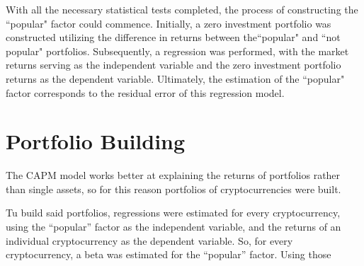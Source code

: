 With all the necessary statistical tests completed, the process of constructing the ``popular" factor could commence. Initially, a zero investment portfolio was constructed utilizing the difference in returns between the``popular" and ``not popular" portfolios. Subsequently, a regression was performed, with the market returns serving as the independent variable and the zero investment portfolio returns as the dependent variable. Ultimately, the estimation of the ``popular" factor corresponds to the residual error of this regression model.

\section{Portfolio Building}
The CAPM model works better at explaining the returns of portfolios rather than single assets, so for this reason portfolios of cryptocurrencies were built.

Tu build said portfolios, regressions were estimated for every cryptocurrency, using the ``popular'' factor as the independent variable, and the returns of an individual cryptocurrency as the dependent variable. So, for every cryptocurrency, a beta was estimated for the ``popular'' factor. Using those 









 